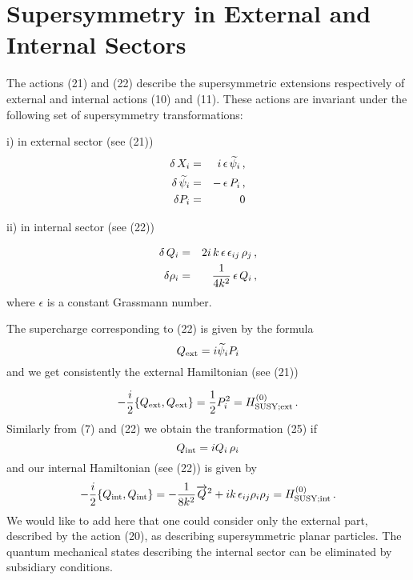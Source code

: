 \documentclass[a4paper,12pt]{article}
\begin{document}
\section{Supersymmetry in External and Internal Sectors}

The actions (21) and (22) describe the supersymmetric extensions
respectively of external and internal actions (10) and (11).
These actions are invariant under the following set of
supersymmetry transformations:

i) in external sector (see (21))
\begin{eqnarray}\label{pary2.24}
\delta\, X_i &= & i\, \epsilon \, \widetilde{\psi}_i \, , \cr
\delta\, \widetilde{\psi}_i &= & - \,  \epsilon \, {P}_i \, , \cr
\delta P_i &=& 0
\end{eqnarray}


ii) in internal sector (see (22))


\begin{eqnarray}\label{pary2.25}
\delta\, Q_i &=&  2i \, k \, \epsilon \, \epsilon_{ij} \, \rho_j
\, ,
\cr
\delta \rho_i &=&  \frac{1}{4k^2}  \, \epsilon \, Q_i\, ,
\end{eqnarray}
where $\epsilon$  is a constant Grassmann number.


The supercharge corresponding to (22) is given by the formula
\begin{equation}\label{pary2.26}
  Q_{\rm ext} = i \widetilde{\psi}_i P_i
\end{equation}
and we get consistently the external Hamiltonian (see (21))

\begin{equation}\label{pary2.27}
-  \frac{i}{2}
\{Q_{\rm ext}, Q_{\rm ext} \}  
 =
  \frac{1}{2} {P}_i^2 = H_{\rm SUSY;ext}^{(0)}\, .
\end{equation}
Similarly from (7) and (22) we obtain the tranformation (25) if
\begin{equation}\label{pary2.28}
Q_{\rm int} = i Q_i \, \rho_i
\end{equation}
and our internal Hamiltonian (see (22)) is given by
\begin{equation}\label{pary2.29}
-  \frac{i}{2}                
\{Q_{\rm int}, Q_{\rm int} \} 
=
- \frac{1}{8k^2} \overrightarrow{Q}^2 
 + i k\, \epsilon_{ij}
\rho_i \rho_j = H_{\rm SUSY;int}^{(0)} \, .
\end{equation}
We would like to add  here that one could consider only the 
external
 part, described by the action (20), as describing supersymmetric 
planar
 particles. The quantum mechanical states describing
  the  internal sector   can be 
 eliminated by  subsidiary conditions.
\end{document}
